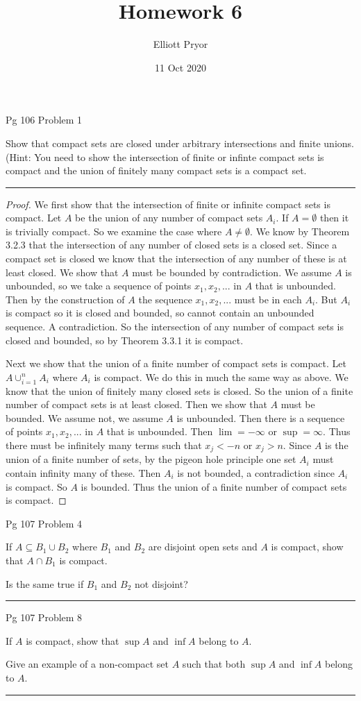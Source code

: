 \documentclass[11pt]{article}
\title{Homework 6}
\author{Elliott Pryor}
\date{11 Oct 2020}
\begin{document}
\maketitle

 Pg 106 Problem 1

Show that compact sets are closed under arbitrary intersections and finite unions. 
(Hint: You need to show the intersection of finite or infinte compact sets is compact and the union of finitely many compact sets is a compact set.

\hrule


\begin{proof}

We first show that the intersection of finite or infinite compact sets is compact. Let $A$ be the union of any number of compact sets $A_i$.
If $A = \emptyset$ then it is trivially compact. 
So we examine the case where $A \neq \emptyset$. We know by Theorem 3.2.3 that the intersection of any number of closed sets is a closed set. Since a compact set is closed we know that the intersection of any number of these is at least closed.
We show that $A$ must be bounded by contradiction. We assume $A$ is unbounded, so we take a sequence of points $x_1, x_2, ...$ in $A$ that is unbounded. 
Then by the construction of $A$ the sequence $x_1, x_2, ...$ must be in each $A_i$. But $A_i$ is compact so it is closed and bounded, so cannot contain an unbounded sequence. A contradiction. 
So the intersection of any number of compact sets is closed and bounded, so by Theorem 3.3.1 it is compact.

Next we show that the union of a finite number of compact sets is compact. Let $A \cup_{i=1}^n A_i$ where $A_i$ is compact. We do this in much the same way as above.
We know that the union of finitely many closed sets is closed. So the union of a finite number of compact sets is at least closed. 
Then we show that $A$ must be bounded. We assume not, we assume $A$ is unbounded. Then there is a sequence of points $x_1, x_2, ...$ in $A$ that is unbounded. Then $\lim = -\infty$ or $\sup = \infty$. 
Thus there must be infinitely many terms such that $x_j < -n$ or $x_j > n$. Since $A$ is the union of a finite number of sets, by the pigeon hole principle one set $A_i$ must contain infinity many of these. Then $A_i$ is not bounded, a contradiction since $A_i$ is compact. So $A$ is bounded. 
Thus the union of a finite number of compact sets is compact.

\end{proof}


\newpage
{} Pg 107 Problem 4

If $A \subseteq B_1 \cup B_2$ where $B_1$ and $B_2$ are disjoint open sets and $A$ is compact, show that $A \cap B_1$ is compact. 

Is the same true if $B_1$ and $B_2$ not disjoint?

\hrule

\newpage
{} Pg 107 Problem 8

If $A$ is compact, show that $\sup A$ and $\inf A$ belong to $A$. 

Give an example of a non-compact set $A$ such that both $\sup A$ and $\inf A$ belong to $A$.

\hrule
\end{document}
